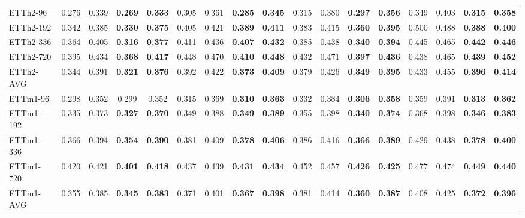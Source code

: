 \begin{table}[t]
{\begin{tabular}{lcccccccccccccccc}
ETTh2-96  & 0.276 & 0.339 & \textbf{0.269} & \textbf{0.333} & 0.305 & 0.361 & \textbf{0.285} & \textbf{0.345} & 0.315 & 0.380 & \textbf{0.297} & \textbf{0.356} & 0.349 & 0.403 & \textbf{0.315} & \textbf{0.358} \\
ETTh2-192 & 0.342 & 0.385 & \textbf{0.330} & \textbf{0.375} & 0.405 & 0.421 & \textbf{0.389} & \textbf{0.411} & 0.383 & 0.415 & \textbf{0.360} & \textbf{0.395} & 0.500 & 0.488 & \textbf{0.388} & \textbf{0.400} \\
ETTh2-336 & 0.364 & 0.405 & \textbf{0.316} & \textbf{0.377} & 0.411 & 0.436 & \textbf{0.407} & \textbf{0.432} & 0.385 & 0.438 & \textbf{0.340} & \textbf{0.394} & 0.445 & 0.465 & \textbf{0.442} & \textbf{0.446} \\
ETTh2-720 & 0.395 & 0.434 & \textbf{0.368} & \textbf{0.417} & 0.448 & 0.470 & \textbf{0.410} & \textbf{0.448} & 0.432 & 0.471 & \textbf{0.397} & \textbf{0.436} & 0.438 & 0.465 & \textbf{0.439} & \textbf{0.452} \\
ETTh2-AVG & 0.344 & 0.391 & \textbf{0.321} & \textbf{0.376} & 0.392 & 0.422 & \textbf{0.373} & \textbf{0.409} & 0.379 & 0.426 & \textbf{0.349} & \textbf{0.395} & 0.433 & 0.455 & \textbf{0.396} & \textbf{0.414} \\
\midrule

ETTm1-96  & 0.298 & 0.352 & {0.299} & {0.352} & 0.315 & 0.369 & \textbf{0.310} & \textbf{0.363} & 0.332 & 0.384 & \textbf{0.306} & \textbf{0.358} & 0.359 & 0.391 & \textbf{0.313} & \textbf{0.362} \\
ETTm1-192 & 0.335 & 0.373 & \textbf{0.327} & \textbf{0.370} & 0.349 & 0.388 & \textbf{0.349} & \textbf{0.389} & 0.355 & 0.398 & \textbf{0.340} & \textbf{0.374} & 0.368 & 0.398 & \textbf{0.346} & \textbf{0.383} \\
ETTm1-336 & 0.366 & 0.394 & \textbf{0.354} & \textbf{0.390} & 0.381 & 0.409 & \textbf{0.378} & \textbf{0.406} & 0.386 & 0.416 & \textbf{0.366} & \textbf{0.389} & 0.429 & 0.438 & \textbf{0.378} & \textbf{0.400} \\
ETTm1-720 & 0.420 & 0.421 & \textbf{0.401} & \textbf{0.418} & 0.437 & 0.439 & \textbf{0.431} & \textbf{0.434} & 0.452 & 0.457 & \textbf{0.426} & \textbf{0.425} & 0.477 & 0.474 & \textbf{0.449} & \textbf{0.440} \\
ETTm1-AVG & 0.355 & 0.385 & \textbf{0.345} & \textbf{0.383} & 0.371 & 0.401 & \textbf{0.367} & \textbf{0.398} & 0.381 & 0.414 & \textbf{0.360} & \textbf{0.387} & 0.408 & 0.425 & \textbf{0.372} & \textbf{0.396} \\
\midrule


\end{tabular}}
\end{table}
